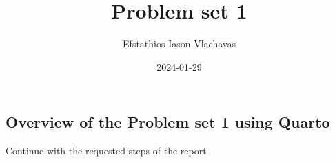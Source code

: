 \documentclass[
  letterpaper,
  DIV=11,
  numbers=noendperiod]{scrartcl}
\title{Problem set 1}
\author{Efstathios-Iason Vlachavas}
\date{2024-01-29}
\renewcommand*\contentsname{Table of contents}
\newcommand\contentsname{Table of contents}
\begin{document}
\maketitle
\ifdefined\Shaded\renewenvironment{Shaded}{\begin{tcolorbox}[frame hidden, breakable, borderline west={3pt}{0pt}{shadecolor}, interior hidden, boxrule=0pt, enhanced, sharp corners]}{\end{tcolorbox}}\fi

\renewcommand*\contentsname{Table of contents}
{
\hypersetup{linkcolor=}
\setcounter{tocdepth}{3}
\tableofcontents
}
\hypertarget{overview-of-the-problem-set-1-using-quarto}{%
\subsection{Overview of the Problem set 1 using
Quarto}\label{overview-of-the-problem-set-1-using-quarto}}

Continue with the requested steps of the report
\end{document}
